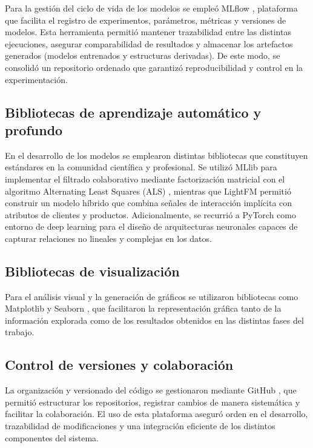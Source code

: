Para la gestión del ciclo de vida de los modelos se empleó MLflow \cite{ARTICLE:MLflow2018}, plataforma que facilita el registro de experimentos, parámetros, métricas y versiones de modelos. Esta herramienta permitió mantener trazabilidad entre las distintas ejecuciones, asegurar comparabilidad de resultados y almacenar los artefactos generados (modelos entrenados y estructuras derivadas). De este modo, se consolidó un repositorio ordenado que garantizó reproducibilidad y control en la experimentación.

\subsection{Bibliotecas de aprendizaje automático y profundo}

En el desarrollo de los modelos se emplearon distintas bibliotecas que constituyen estándares en la comunidad científica y profesional. Se utilizó MLlib para implementar el filtrado colaborativo mediante factorización matricial con el algoritmo Alternating Least Squares (ALS) \cite{ARTICLE:ALS2008}, mientras que LightFM \cite{ARTICLE:LightFM2015} permitió construir un modelo híbrido que combina señales de interacción implícita con atributos de clientes y productos. Adicionalmente, se recurrió a PyTorch como entorno de deep learning para el diseño de arquitecturas neuronales capaces de capturar relaciones no lineales y complejas en los datos. 

\subsection{Bibliotecas de visualización}

Para el análisis visual y la generación de gráficos se utilizaron bibliotecas como Matplotlib \cite{ARTICLE:Matplotlib2007} y Seaborn \cite{ARTICLE:Seaborn2021}, que facilitaron la representación gráfica tanto de la información explorada como de los resultados obtenidos en las distintas fases del trabajo.

\subsection{Control de versiones y colaboración}

La organización y versionado del código se gestionaron mediante GitHub \cite{ARTICLE:GitHub}, que permitió estructurar los repositorios, registrar cambios de manera sistemática y facilitar la colaboración. El uso de esta plataforma aseguró orden en el desarrollo, trazabilidad de modificaciones y una integración eficiente de los distintos componentes del sistema.

